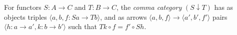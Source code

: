 For functors $S: A \to C$ and $T: B \to C$, the \emph{comma category} $(S \downarrow T)$ has as objects triples $\langle a, b, f: Sa \to Tb \rangle$, and as arrows $\langle a, b, f \rangle \to \langle a', b', f' \rangle$ pairs $\langle h: a \to a', k: b \to b' \rangle$ such that $Tk \circ f = f' \circ Sh$.
